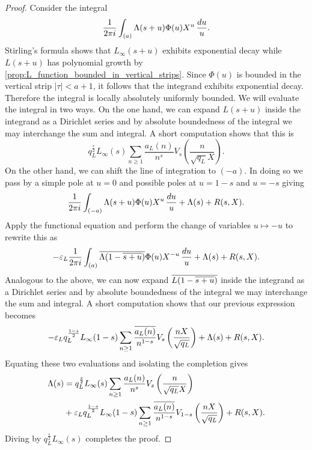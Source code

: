 \documentclass[12pt]{article}
\begin{document}
    \begin{proof}
      Consider the integral
      \[
        \frac{1}{2\pi i}\int_{(a)}\Lambda(s+u)\Phi(u)X^{u}\,\frac{du}{u}.
      \]    
      Stirling's formula shows that \(L_{\infty}(s+u)\) exhibits exponential decay while \(L(s+u)\) has polynomial growth by \cref{prop:L_function_bounded_in_vertical_strips}. Since \(\Phi(u)\) is bounded in the vertical strip \(|\tau| < a+1\), it follows that the integrand exhibits exponential decay. Therefore the integral is locally absolutely uniformly bounded. We will evaluate the integral in two ways. On the one hand, we can expand \(L(s+u)\) inside the integrand as a Dirichlet series and by absolute boundedness of the integral we may interchange the sum and integral. A short computation shows that this is
      \[
        q_{L}^{\frac{s}{2}}L_{\infty}(s)\sum_{n \ge 1}\frac{a_{L}(n)}{n^{s}}V_{s}\left(\frac{n}{\sqrt{q_{L}}X}\right).
      \]
      On the other hand, we can shift the line of integration to \((-a)\). In doing so we pass by a simple pole at \(u = 0\) and possible poles at \(u = 1-s\) and \(u = -s\) giving
      \[
        \frac{1}{2\pi i}\int_{(-a)}\Lambda(s+u)\Phi(u)X^{u}\,\frac{du}{u}+\Lambda(s)+R(s,X).
      \]
      Apply the functional equation and perform the change of variables \(u \mapsto -u\) to rewrite this as
      \[
        -\varepsilon_{L}\frac{1}{2\pi i}\int_{(a)}\overline{\Lambda(1-\overline{s+u})}\Phi(u)X^{-u}\,\frac{du}{u}+\Lambda(s)+R(s,X).
      \]
      Analogous to the above, we can now expand \(\overline{L(1-\overline{s+u})}\) inside the integrand as a Dirichlet series and by absolute boundedness of the integral we may interchange the sum and integral. A short computation shows that our previous expression becomes
      \[
        -\varepsilon_{L}q_{L}^{\frac{1-s}{2}}L_{\infty}(1-s)\sum_{n \ge 1}\frac{\overline{a_{L}(n)}}{n^{1-s}}V_{s}\left(\frac{nX}{\sqrt{q_{L}}}\right)+\Lambda(s)+R(s,X).
      \]
      Equating these two evaluations and isolating the completion gives
      \begin{align*}
        \Lambda(s) &= q_{L}^{\frac{s}{2}}L_{\infty}(s)\sum_{n \ge 1}\frac{a_{L}(n)}{n^{s}}V_{s}\left(\frac{n}{\sqrt{q_{L}}X}\right) \\
        &+ \varepsilon_{L}q_{L}^{\frac{1-s}{2}}L_{\infty}(1-s)\sum_{n \ge 1}\frac{\overline{a_{L}(n)}}{n^{1-s}}V_{1-s}\left(\frac{nX}{\sqrt{q_{L}}}\right)+R(s,X).
      \end{align*}
      Diving by \(q_{L}^{\frac{s}{2}}L_{\infty}(s)\) completes the proof.
    \end{proof}
\end{document}
